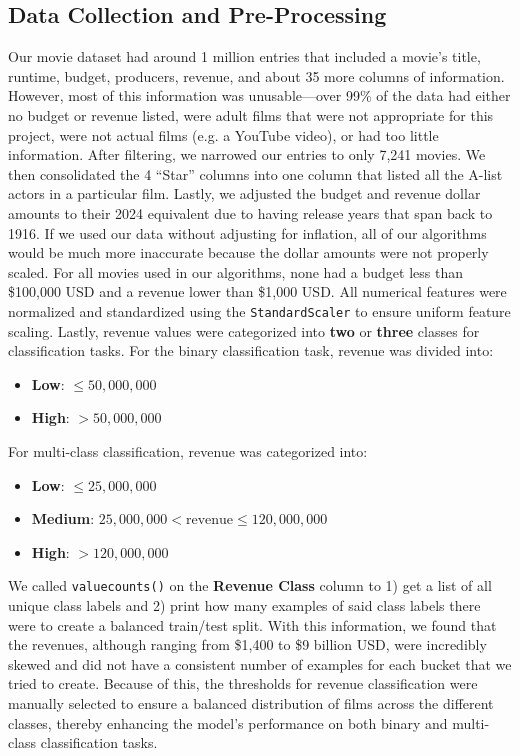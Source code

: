 \documentclass{article}
\begin{document}
\subsection{Data Collection and Pre-Processing}
Our movie dataset had around 1 million entries that included a movie’s title, runtime, budget, producers, revenue, and about 35 more columns of information. However, most of this information was unusable—over 99\% of the data had either no budget or revenue listed, were adult films that were not appropriate for this project, were not actual films (e.g. a YouTube video), or had too little information. After filtering, we narrowed our entries to only 7,241 movies. We then consolidated the 4 “Star” columns into one column that listed all the A-list actors in a particular film. Lastly, we adjusted the budget and revenue dollar amounts to their 2024 equivalent due to having release years that span back to 1916. If we used our data without adjusting for inflation, all of our algorithms would be much more inaccurate because the dollar amounts were not properly scaled. For all movies used in our algorithms, none had a budget less than \$100,000 USD and a revenue lower than \$1,000 USD. All numerical features were normalized and standardized using the \texttt{StandardScaler} to ensure uniform feature scaling. Lastly, revenue values were categorized into \textbf{two} or \textbf{three} classes for classification tasks. For the binary classification task, revenue was divided into:
\begin{itemize}
    \item \textbf{Low}: \( \leq 50,000,000 \)
    \item \textbf{High}: \( > 50,000,000 \)
\end{itemize}
For multi-class classification, revenue was categorized into:
\begin{itemize}
    \item \textbf{Low}: \( \leq 25,000,000 \)
    \item \textbf{Medium}: \( 25,000,000 < \text{revenue} \leq 120,000,000 \)
    \item \textbf{High}: \( > 120,000,000 \)
\end{itemize}
We called \texttt{value\textunderscore counts()} on the \textbf{Revenue Class} column to 1) get a list of all unique class labels and 2) print how many examples of said class labels there were to create a balanced train/test split. With this information, we found that the revenues, although ranging from \$1,400 to \$9 billion USD, were incredibly skewed and did not have a consistent number of examples for each bucket that we tried to create. Because of this, the thresholds for revenue classification were manually selected to ensure a balanced distribution of films across the different classes, thereby enhancing the model's performance on both binary and multi-class classification tasks.
\end{document}
